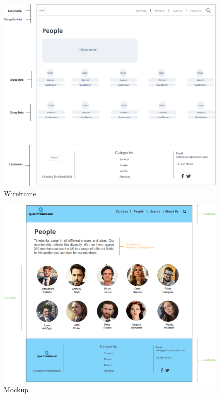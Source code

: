\documentclass[a4paper, 11pt, parskip=half, headsepline]{scrreprt}
\begin{document}
\begin{figure}[H]
    \centering
    \includegraphics[width=1\linewidth, keepaspectratio]{wireframes/Introductory-People}
    \caption{Wireframe}
\end{figure}

\begin{figure}[H]
    \centering
    \includegraphics[width=1\linewidth, keepaspectratio]{mockups/ConcretePeople}
    \caption{Mockup}
\end{figure}
\end{document}
